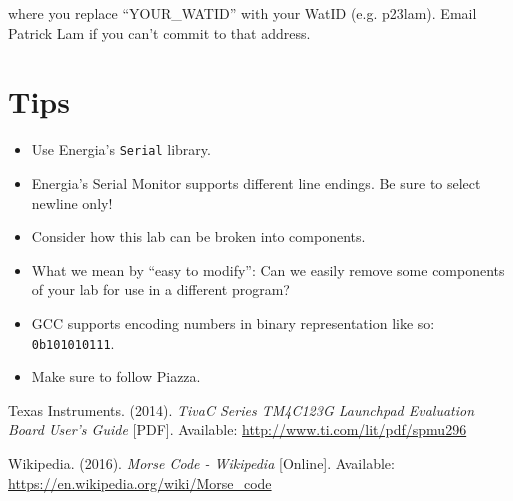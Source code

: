 \documentclass{article}
\begin{document}
where you replace ``YOUR\_WATID'' with your WatID (e.g. p23lam). Email Patrick Lam if you can't commit to that address.

\section*{Tips}
\begin{itemize}
	\item Use Energia's \texttt{Serial} library.
	\item Energia's Serial Monitor supports different line endings.  Be sure to select newline only!
	\item Consider how this lab can be broken into components.
	\item What we mean by ``easy to modify'': Can we easily remove some components of your lab for use in a different program?
	\item GCC supports encoding numbers in binary representation like so: \texttt{0b101010111}.
	\item Make sure to follow Piazza.
\end{itemize}

\begin{flushleft}
\begin{thebibliography}{1}

	Texas Instruments.
	(2014).
	\emph{Tiva\texttrademark C Series TM4C123G Launchpad Evaluation Board User's Guide} [PDF].
	Available: \url{http://www.ti.com/lit/pdf/spmu296}

	Wikipedia.
	(2016).
	\emph{Morse Code - Wikipedia} [Online].
	Available: \url{https://en.wikipedia.org/wiki/Morse_code}

\end{thebibliography}
\end{flushleft}
\end{document}

